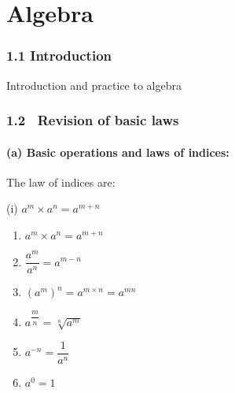 \documentclass{article}
\begin{document}
\part{Algebra}

\section{1.1 Introduction}

Introduction and practice to algebra

\section{1.2 \ Revision of basic laws}

\subsection{(a) Basic operations and laws of indices:}

The law of indices are:

(i) $a^{m}\times a^{n}=a^{m+n}$

\begin{enumerate}
\item $a^{m}\times a^{n}=a^{m+n}$

\item $\dfrac{a^{m}}{a^{n}}=a^{m-n}$

\item $\left( a^{m}\right) ^{n}=a^{m\times n}=a^{mn}$

\item $a^{\dfrac{m}{n}}=\sqrt[n]{a^{m}}$

\item $a^{-n}=\dfrac{1}{a^{n}}$

\item $a^{0}=1$
\end{enumerate}

\begin{description}
\item 
\end{description}
\end{document}
